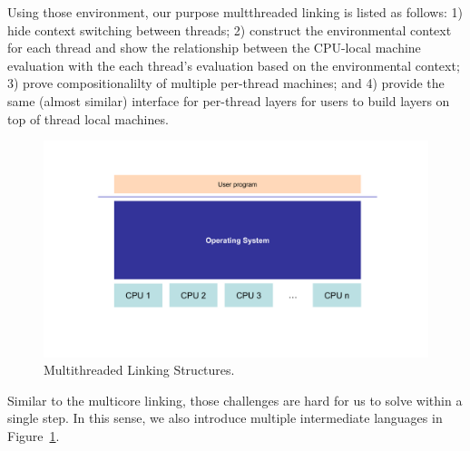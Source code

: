 Using those environment, 
our purpose multthreaded linking is listed as follows:
1) hide context switching between threads; 
2) construct the environmental context for each thread and show the relationship between the 
CPU-local machine evaluation with the each thread's evaluation based on the environmental context;
3) prove compositionalilty of multiple per-thread machines; and 
4) provide the same (almost similar) interface for per-thread layers 
for users to build layers on top of thread local machines. 
\begin{figure}
\begin{center}
\includegraphics[width=\textwidth, page=21]{figs/conlink/concurrent_linking}
\caption{Multithreaded Linking Structures.}
\label{fig:chapter:linking:multithreaded-linking-structure}
\end{center}
\end{figure}
Similar to the multicore linking, 
those challenges are hard for us to solve within a single step. 
In this sense, 
we also introduce multiple intermediate languages
in Figure~\ref{fig:chapter:linking:multithreaded-linking-structure}. 


